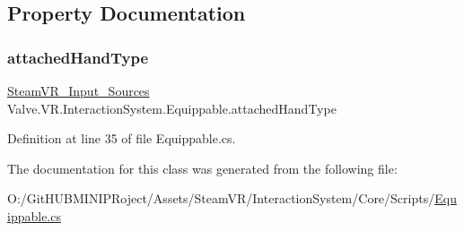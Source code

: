 \subsection{Property Documentation}
\mbox{\label{class_valve_1_1_v_r_1_1_interaction_system_1_1_equippable_a1e270504e8965c0706f49d45c0861e12}} 
\subsubsection{\texorpdfstring{attachedHandType}{attachedHandType}}
{\footnotesize\ttfamily \mbox{\hyperlink{namespace_valve_1_1_v_r_a82e5bf501cc3aa155444ee3f0662853f}{Steam\+V\+R\+\_\+\+Input\+\_\+\+Sources}} Valve.\+V\+R.\+Interaction\+System.\+Equippable.\+attached\+Hand\+Type\hspace{0.3cm}{\ttfamily [get]}}



Definition at line 35 of file Equippable.\+cs.



The documentation for this class was generated from the following file\+:\begin{DoxyCompactItemize}
\item 
O\+:/\+Git\+H\+U\+B\+M\+I\+N\+I\+P\+Roject/\+Assets/\+Steam\+V\+R/\+Interaction\+System/\+Core/\+Scripts/\mbox{\hyperlink{_equippable_8cs}{Equippable.\+cs}}\end{DoxyCompactItemize}
